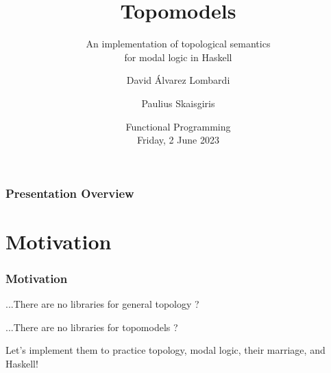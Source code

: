 \documentclass[
	11pt, %
	aspectratio=1610, %
]{beamer}
\title[Topomodels]{Topomodels} %
\subtitle{An implementation of topological semantics \\ for modal logic in Haskell} %
\author[David Álvarez Lombardi \& Paulius Skaisgiris]{David Álvarez Lombardi \and Paulius Skaisgiris} %
\institute[]{Institute for Logic, Language, and Computation \\ \smallskip University of Amsterdam} %
\date[Friday, 2 June 2023]{Functional Programming\\ \smallskip Friday, 2 June 2023} %
\begin{document}

\begin{frame}
	\titlepage %
\end{frame}



\begin{frame}
	\frametitle{Presentation Overview} %

	\tableofcontents %
\end{frame}


\section{Motivation}


\begin{frame}
	\frametitle{Motivation}

	...There are no libraries for general topology ?

	\bigskip\bigskip

	...There are no libraries for topomodels ?

	\bigskip\bigskip

	Let's implement them to practice topology, modal logic, their marriage, and Haskell!

\end{frame}
\end{document}
